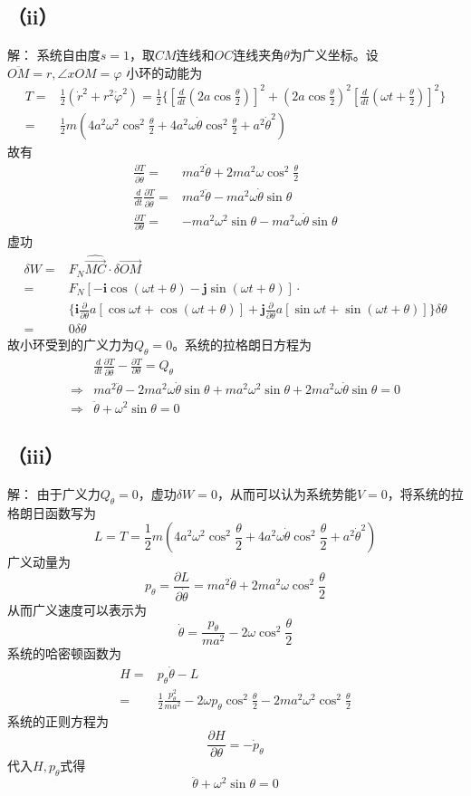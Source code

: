 \documentclass[10pt,a4paper]{article}
\begin{document}
\subsection*{（ii）}解：
系统自由度$s=1$，取$CM$连线和$OC$连线夹角$\theta$为广义坐标。设$\overline{OM}=r,\angle xOM=\varphi$ 小环的动能为
\begin{align*}
T=&\frac{1}{2}(\dot{r}^2+r^2\dot{\varphi}^2)=\frac{1}{2}\{[\frac{d}{dt}(2a\cos\frac{\theta}{2})]^2+(2a\cos\frac{\theta}{2})^2[\frac{d}{dt}(\omega t+\frac{\theta}{2})]^2\}\\
=&\frac{1}{2}m(4a^2\omega^2\cos^2\frac{\theta}{2}+4a^2\omega\dot{\theta}\cos^2\frac{\theta}{2}+a^2\dot{\theta}^2)
\end{align*}
故有
\begin{align*}
\frac{\partial T}{\partial\dot{\theta}}=&ma^2\dot{\theta}+2ma^2\omega\cos^2\frac{\theta}{2}\\
\frac{d}{dt}\frac{\partial T}{\partial\dot{\theta}}=&ma^2\ddot{\theta}-ma^2\omega\dot{\theta}\sin\theta\\
\frac{\partial T}{\partial\theta}=&-ma^2\omega^2\sin\theta-ma^2\omega\dot{\theta}\sin\theta
\end{align*}
虚功
\begin{align*}
\delta W=&F_N\widehat{\overrightarrow{MC}}\cdot\delta\overrightarrow{OM}\\
=&F_N[-\bm{i}\cos(\omega t+\theta)-\bm{j}\sin(\omega t+\theta)]\cdot\\
&\{\bm{i}\frac{\partial}{\partial\theta}a[\cos\omega t+\cos(\omega t+\theta)]+\bm{j}\frac{\partial}{\partial\theta}a[\sin\omega t+\sin(\omega t+\theta)]\}\delta\theta\\
=&0\delta\theta
\end{align*}
故小环受到的广义力为$Q_{\theta}=0$。系统的拉格朗日方程为
\begin{align*}
&\frac{d}{dt}\frac{\partial T}{\partial\dot{\theta}}-\frac{\partial T}{\partial\theta}=Q_{\theta}\\
\Longrightarrow&ma^2\ddot{\theta}-2ma^2\omega\dot{\theta}\sin\theta+ma^2\omega^2\sin\theta+2ma^2\omega\dot{\theta}\sin\theta=0\\
\Longrightarrow&\ddot{\theta}+\omega^2\sin\theta=0
\end{align*}
\subsection*{（iii）}解：
由于广义力$Q_{\theta}=0$，虚功$\delta W=0$，从而可以认为系统势能$V=0$，将系统的拉格朗日函数写为
\[
L=T=\frac{1}{2}m(4a^2\omega^2\cos^2\frac{\theta}{2}+4a^2\omega\dot{\theta}\cos^2\frac{\theta}{2}+a^2\dot{\theta}^2)
\]
广义动量为
\[
p_{\theta}=\frac{\partial L}{\partial\dot{\theta}}=ma^2\dot{\theta}+2ma^2\omega\cos^2\frac{\theta}{2}
\]
从而广义速度可以表示为
\[
\dot{\theta}=\frac{p_{\theta}}{ma^2}-2\omega\cos^2\frac{\theta}{2}
\]
系统的哈密顿函数为
\begin{align*}
H=&p_{\theta}\dot{\theta}-L\\
=&\frac{1}{2}\frac{p_{\theta}^2}{ma^2}-2\omega p_{\theta}\cos^2\frac{\theta}{2}-2ma^2\omega^2\cos^2\frac{\theta}{2}
\end{align*}
系统的正则方程为
\[
\frac{\partial H}{\partial\theta}=-\dot{p}_{\theta}
\]
代入$H,p_{\theta}$式得
\[
\ddot{\theta}+\omega^2\sin\theta=0
\]
\end{document}

